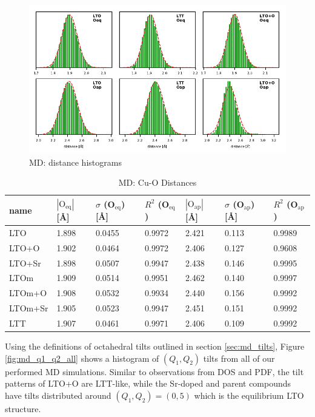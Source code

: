 \begin{figure}
	\centering
	\includegraphics[width=\textwidth]{fig/md/dist_hist.pdf}
	\caption[MD: distance histograms]{MD: distance histograms}
	\label{fig:md_distances}
\end{figure}

\begin{table}
	\centering
	\caption{MD: Cu-O Distances}
	\label{tab:md_cu_o_distances}
	\begin{tabular}{lllllll}
		\toprule
			name &   $|\text{O}_\text{eq}|$ [\AA]  & $\sigma$ (O$_\text{eq}$) [\AA] &  $R^2$ (O$_\text{eq}$) & $|\text{O}_\text{ap}|$ [\AA] & $\sigma$ (O$_\text{ap}$) [\AA] &  $R^2$ (O$_\text{ap}$) \\
		\midrule
			 LTO &  1.898 &  0.0455 &  0.9972 &  2.421 &   0.113 &  0.9989 \\
		   LTO+O &  1.902 &  0.0464 &  0.9972 &  2.406 &   0.127 &  0.9608 \\
		  LTO+Sr &  1.898 &  0.0507 &  0.9947 &  2.438 &   0.146 &  0.9995 \\
			LTOm &  1.909 &  0.0514 &  0.9951 &  2.462 &   0.140 &  0.9997 \\
		  LTOm+O &  1.908 &  0.0532 &  0.9934 &  2.440 &   0.156 &  0.9992 \\
		 LTOm+Sr &  1.905 &  0.0523 &  0.9947 &  2.451 &   0.151 &  0.9992 \\
			 LTT &  1.907 &  0.0461 &  0.9971 &  2.406 &   0.109 &  0.9992 \\
		\bottomrule
		\end{tabular}
\end{table}

Using the definitions of octahedral tilts outlined in section \ref{sec:md_tilts}, Figure \ref{fig:md_q1_q2_all} shows a histogram of $(Q_1, Q_2)$ tilts from all of our performed MD simulations. Similar to observations from DOS and PDF, the tilt patterns of LTO+O are LTT-like, while the Sr-doped and parent compounds have tilts distributed around $(Q_1, Q_2) = (0,5)$ which is the equilibrium LTO structure.

